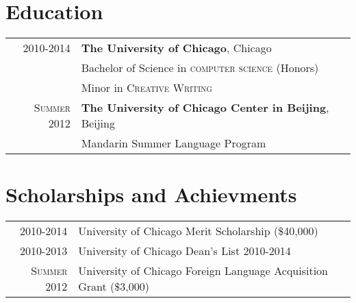 \documentclass[a4paper,10pt]{article} %
\begin{document}

\section{Education}

\begin{tabular}{rl}	
\textsc{2010-2014} & \textbf{The University of Chicago}, Chicago\\
& Bachelor of Science in \textsc{computer science} (Honors) \\
& Minor in \textsc{Creative Writing} \vspace{9pt} \\


\textsc{Summer 2012} & \textbf{The University of Chicago Center in Beijing}, Beijing\\
& Mandarin Summer Language Program
\end{tabular}


\section{Scholarships and Achievments}

\begin{tabular}{rl}
\vspace{2pt}\textsc{2010-2014} & University of Chicago Merit Scholarship \footnotesize(\$40,000)\normalsize\\
\vspace{2pt}\textsc{2010-2013} & University of Chicago Dean's List 2010-2014\\
\textsc{Summer 2012} & University of Chicago Foreign Language Acquisition Grant \footnotesize(\$3,000)\normalsize\\

\end{tabular}

\end{document}
